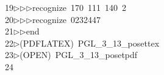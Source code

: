 \begin{tabbing}
19\>$\triangleright$\>$\triangleright$\>$\triangleright$\>recognize\ 170\ 111\ 140\ 2\ \\[0pt]
20\>$\triangleright$\>$\triangleright$\>$\triangleright$\>recognize\ 0232447\ \\[0pt]
21\>$\triangleright$\>$\triangleright$\>end\\[0pt]
22\>$\triangleright$\>(PDFLATEX)\ PGL\_3\_13\_posettex\\[0pt]
23\>$\triangleright$\>(OPEN)\ PGL\_3\_13\_posetpdf\\[0pt]
24\>\end{tabbing}

